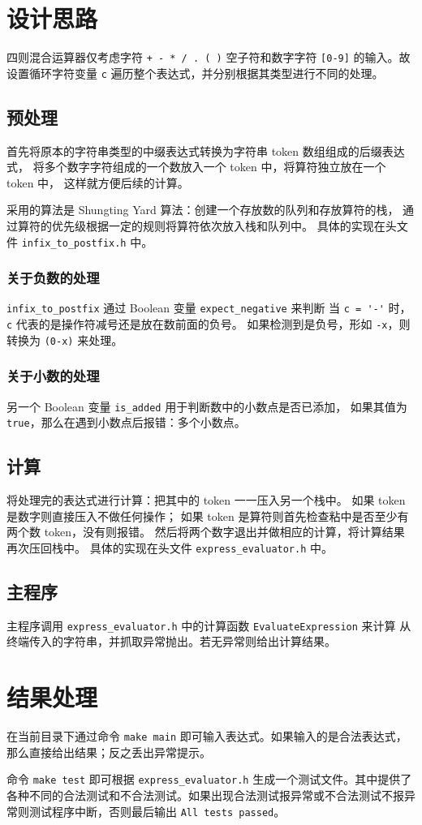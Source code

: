 \documentclass[UTF8, 12pt]{ctexart}
\begin{document}
\section{设计思路}
四则混合运算器仅考虑字符 \verb|+ - * / . ( )| 空子符和数字字符 \verb|[0-9]| 的输入。故设置循环字符变量 \verb|c| 遍历整个表达式，并分别根据其类型进行不同的处理。
\subsection{预处理}
首先将原本的字符串类型的中缀表达式转换为字符串 token 数组组成的后缀表达式，
将多个数字字符组成的一个数放入一个 token 中，将算符独立放在一个 token 中，
这样就方便后续的计算。

采用的算法是 Shungting Yard 算法：创建一个存放数的队列和存放算符的栈，
通过算符的优先级根据一定的规则将算符依次放入栈和队列中。
具体的实现在头文件 \verb|infix_to_postfix.h| 中。
\subsubsection{关于负数的处理}
\verb|infix_to_postfix| 通过 Boolean 变量 \verb|expect_negative| 来判断
当 \verb|c = '-'| 时，\verb|c| 代表的是操作符减号还是放在数前面的负号。
如果检测到是负号，形如 \verb|-x|，则转换为 \verb|(0-x)| 来处理。
\subsubsection{关于小数的处理}
另一个 Boolean 变量 \verb|is_added| 用于判断数中的小数点是否已添加，
如果其值为 \verb|true|，那么在遇到小数点后报错：多个小数点。
\subsection{计算}
将处理完的表达式进行计算：把其中的 token 一一压入另一个栈中。
如果 token 是数字则直接压入不做任何操作；
如果 token 是算符则首先检查粘中是否至少有两个数 token，没有则报错。
然后将两个数字退出并做相应的计算，将计算结果再次压回栈中。
具体的实现在头文件 \verb|express_evaluator.h| 中。
\subsection{主程序}
主程序调用 \verb|express_evaluator.h| 中的计算函数 \verb|EvaluateExpression| 来计算
从终端传入的字符串，并抓取异常抛出。若无异常则给出计算结果。
\section{结果处理}
在当前目录下通过命令 \verb|make main| 即可输入表达式。如果输入的是合法表达式，
那么直接给出结果；反之丢出异常提示。

命令 \verb|make test| 即可根据 \verb|express_evaluator.h| 生成一个测试文件。其中提供了各种不同的合法测试和不合法测试。如果出现合法测试报异常或不合法测试不报异常则测试程序中断，否则最后输出 \verb|All tests passed|。
\end{document}
